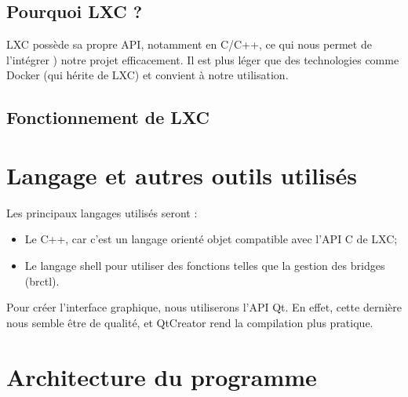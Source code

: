 \documentclass[a4paper]{article}
\begin{document}
\subsection{Pourquoi LXC ?}

LXC poss\`ede sa propre API, notamment en C/C++, ce qui nous permet de l'int\'egrer ) notre projet efficacement.
Il est plus l\'eger que des technologies comme Docker (qui h\'erite de LXC) et convient \`a notre utilisation.

\subsection{Fonctionnement de LXC}

\section{Langage et autres outils utilisés}
Les principaux langages utilisés seront : 
\begin{itemize}
  \item Le C++, car c'est un langage orienté objet compatible avec l'API C de LXC;
  \item Le langage shell pour utiliser des fonctions telles que la gestion des bridges (brctl).
\end{itemize}

Pour créer l'interface graphique, nous utiliserons l'API Qt. En effet, cette dernière nous semble être de qualité, et QtCreator rend la compilation plus pratique.

\newpage
\section{Architecture du programme}
\end{document}
